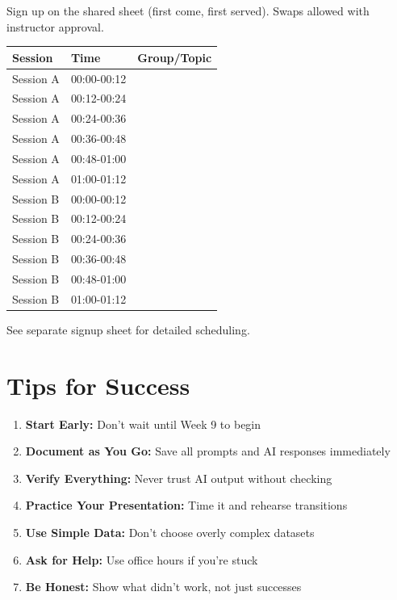 \documentclass[11pt]{article}
\begin{document}
Sign up on the shared sheet (first come, first served). Swaps allowed with instructor approval.

\begin{center}
\begin{tabular}{lll}
\toprule
\textbf{Session} & \textbf{Time} & \textbf{Group/Topic} \\
\midrule
Session A & 00:00-00:12 & \\
Session A & 00:12-00:24 & \\
Session A & 00:24-00:36 & \\
Session A & 00:36-00:48 & \\
Session A & 00:48-01:00 & \\
Session A & 01:00-01:12 & \\
\midrule
Session B & 00:00-00:12 & \\
Session B & 00:12-00:24 & \\
Session B & 00:24-00:36 & \\
Session B & 00:36-00:48 & \\
Session B & 00:48-01:00 & \\
Session B & 01:00-01:12 & \\
\bottomrule
\end{tabular}
\end{center}

See separate signup sheet for detailed scheduling.

\section{Tips for Success}

\begin{enumerate}
\item \textbf{Start Early:} Don't wait until Week 9 to begin
\item \textbf{Document as You Go:} Save all prompts and AI responses immediately
\item \textbf{Verify Everything:} Never trust AI output without checking
\item \textbf{Practice Your Presentation:} Time it and rehearse transitions
\item \textbf{Use Simple Data:} Don't choose overly complex datasets
\item \textbf{Ask for Help:} Use office hours if you're stuck
\item \textbf{Be Honest:} Show what didn't work, not just successes
\end{enumerate}
\end{document}
